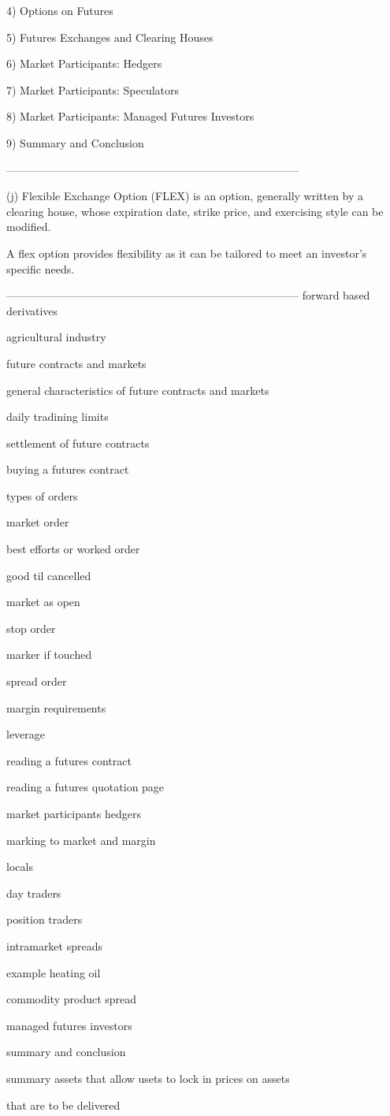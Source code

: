 4) Options on Futures

5) Futures Exchanges and Clearing Houses

6) Market Participants: Hedgers

7) Market Participants: Speculators

8) Market Participants: Managed Futures Investors

9) Summary and Conclusion





--------------------------------------------------------------------------------


(j) Flexible Exchange Option (FLEX) is an option, generally written by a clearing house, whose expiration date, strike price, and exercising style can be modified.


A flex option provides flexibility as it can be tailored to meet an investor's specific needs.






--------------------------------------------------------------------------------
forward based derivatives

agricultural industry

future contracts and markets

general characteristics of future contracts and markets

daily tradining limits

settlement of future contracts

buying a futures contract

types of orders 

market order

best efforts or worked order

good til cancelled

market as open

stop order

marker if touched

spread order

margin requirements

leverage

reading a futures contract

reading a futures quotation page

market participants  hedgers

marking to market and margin

locals

day traders

position traders

intramarket spreads

example heating oil

commodity product spread

managed futures investors

summary and conclusion


summary assets that allow usets to lock in prices on assets

that are to be delivered

